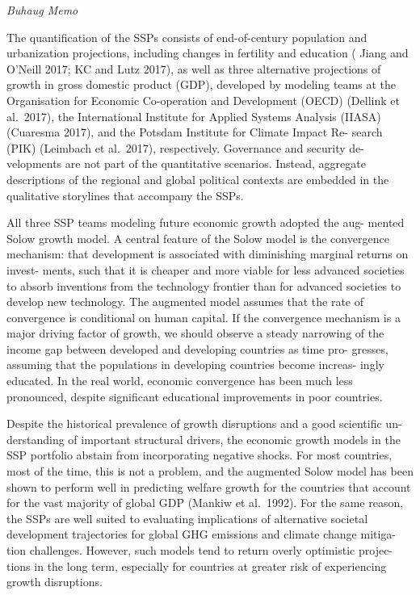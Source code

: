 \documentclass[
]{book}
\begin{document}
\emph{Buhaug Memo}

The quantiﬁcation of the SSPs consists of end-of-century population and
urbanization projections, including changes in fertility and education ( Jiang
and O'Neill 2017; KC and Lutz 2017), as well as three alternative projections
of growth in gross domestic product (GDP), developed by modeling teams
at the Organisation for Economic Co-operation and Development (OECD)
(Dellink et al.~2017), the International Institute for Applied Systems Analysis
(IIASA) (Cuaresma 2017), and the Potsdam Institute for Climate Impact Re-
search (PIK) (Leimbach et al.~2017), respectively. Governance and security de-
velopments are not part of the quantitative scenarios. Instead, aggregate
descriptions of the regional and global political contexts are embedded in the
qualitative storylines that accompany the SSPs.

All three SSP teams modeling future economic growth adopted the aug-
mented Solow growth model.
A central feature of the Solow model is the convergence mechanism:
that development is associated with diminishing marginal returns on invest-
ments, such that it is cheaper and more viable for less advanced societies to
absorb inventions from the technology frontier than for advanced societies to
develop new technology. The augmented model assumes that the rate of
convergence is conditional on human capital. If the convergence mechanism
is a major driving factor of growth, we should observe a steady narrowing of
the income gap between developed and developing countries as time pro-
gresses, assuming that the populations in developing countries become increas-
ingly educated.
In the real world, economic convergence has been much less pronounced,
despite signiﬁcant educational improvements in poor countries.

Despite the historical prevalence of growth disruptions and a good scientiﬁc un-
derstanding of important structural drivers, the economic growth models in the
SSP portfolio abstain from incorporating negative shocks.
For most countries,
most of the time, this is not a problem, and the augmented Solow model has
been shown to perform well in predicting welfare growth for the countries that
account for the vast majority of global GDP (Mankiw et al.~1992). For the same
reason, the SSPs are well suited to evaluating implications of alternative societal
development trajectories for global GHG emissions and climate change mitiga-
tion challenges. However, such models tend to return overly optimistic projec-
tions in the long term, especially for countries at greater risk of experiencing
growth disruptions.
\end{document}
